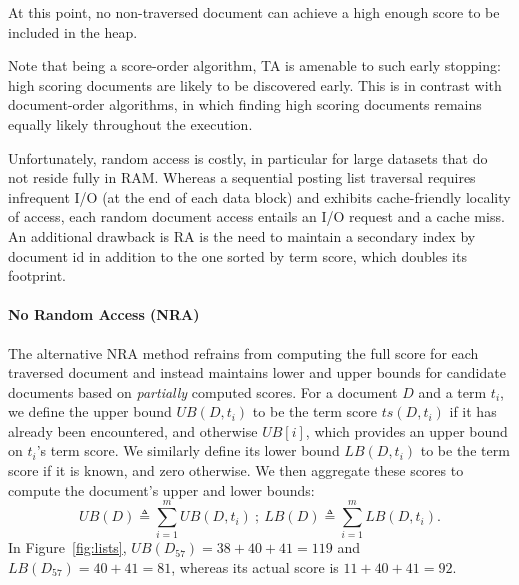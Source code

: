 At this point, no non-traversed document can achieve a high enough score to be included in the heap. 

Note that being a score-order algorithm,  TA is amenable to such early stopping: high scoring documents are likely to be discovered early.
This is in contrast with document-order algorithms, in which finding high scoring documents remains equally likely throughout the execution.

Unfortunately, random access is costly,  in particular for large datasets that do not reside fully in RAM.
Whereas a sequential posting list traversal requires infrequent I/O (at the end of each data block) and exhibits cache-friendly locality of access,  each random document access entails an I/O request and a cache miss.  
An additional drawback is RA is the need to maintain a secondary index by document id in addition to the one sorted by term score, which doubles its footprint. 

\paragraph{No Random Access (NRA)} 
The alternative NRA method %
refrains from computing the full score for each traversed document and instead
maintains lower and upper bounds for candidate documents based on {\em partially\/} computed scores. 
For a document $D$ and a term $t_i$, we define the upper bound $UB(D, t_i)$ to be the term score $ts(D, t_i)$ if it has already been encountered, and otherwise $UB[i]$, which provides an upper bound on $t_i$'s term score. We similarly define its lower bound $LB(D, t_i)$ to be the term score if it is known, and zero otherwise. We then aggregate these scores to compute the document's upper and lower bounds:
\[
UB(D) \triangleq \sum_{i=1}^m UB(D, t_i) \ ; \  
LB(D) \triangleq \sum_{i=1}^m LB(D, t_i).
\] 
In Figure~\ref{fig:lists}, $UB(D_{57}) = 38+40+41 = 119$ and $LB(D_{57}) = 40+41 = 81$, whereas its actual score  is $11+ 40+41 = 92$.

